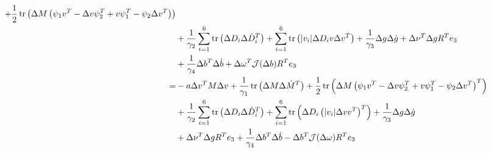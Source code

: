 \begin{align}
  +\frac{1}{2}\operatorname{tr}\left(\Delta M \left(\psi_1v^T  -\Delta v\psi_2^T 
     +v\psi_1^T -\psi_2\Delta v^T \right)\right) 
  \nonumber  \\
  &+\frac{1}{\gamma_2}\sum_{i=1}^6\operatorname{tr}\left(\Delta D_i \Delta\dot{ D}_i^{T}\right)
   +\sum_{i=1}^6 \operatorname{tr}\left(|v_i|\Delta D_i v\Delta v^T \right) 
  +\frac{1}{\gamma_3}\Delta g \Delta\dot{ g}
   +\Delta \nu^T \Delta g R^T e_3
  \nonumber \\
  &+\frac{1}{\gamma_4}\Delta b^T \Delta\dot{ b}
   +\Delta \omega^T\mathcal{J}(\Delta b)R^T e_3
  \nonumber \\
 =&-a\Delta v^T M \Delta v
    +\frac{1}{\gamma_1}\operatorname{tr}\left(\Delta M \Delta\dot{ M}^{T}\right)   
  +\frac{1}{2}\operatorname{tr}\left(\Delta M \left(\psi_1v^T  -\Delta v\psi_2^T 
     +v\psi_1^T -\psi_2\Delta v^T \right)^T\right) 
  \nonumber  \\
  &+\frac{1}{\gamma_2}\sum_{i=1}^6\operatorname{tr}\left(\Delta D_i \Delta\dot{ D}_i^{T}\right) 
  +\sum_{i=1}^6 \operatorname{tr}\left(\Delta D_i \left(|v_i|\Delta v v^T\right)^T\right)
   +\frac{1}{\gamma_3}\Delta g \Delta\dot{ g}
  \nonumber \\
  &+\Delta \nu^T \Delta g R^T e_3
   +\frac{1}{\gamma_4}\Delta b^T \Delta\dot{ b}
   -\Delta b^T\mathcal{J}(\Delta \omega)R^T e_3
\label{chUV_AID.eq.UV_SE3_lyapDotLong}
\end{align}

